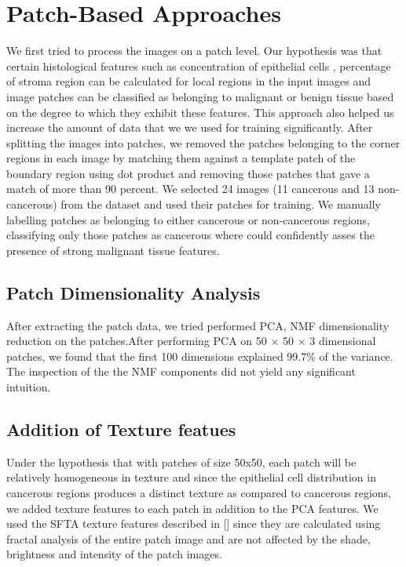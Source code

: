 \section{Patch-Based Approaches}
\label{sec:patch_based_approaches}
We first tried to process the images on a patch level. Our hypothesis was that certain histological features such as concentration of epithelial cells , percentage of stroma region can be calculated for local regions in the input images and image patches can be classified as belonging to malignant or benign tissue based on the degree to which they exhibit these features. This approach also helped us increase the amount of data that we we used for training significantly. After splitting the images into patches, we removed the patches belonging to the corner regions in each image by matching them against a template patch of the boundary region using dot product and removing those patches that gave a match of more than 90 percent. We selected 24 images (11 cancerous and 13 non-cancerous) from the dataset and used their patches for training. We manually labelling patches as belonging to either cancerous or non-cancerous regions, classifying only those patches as cancerous where could confidently asses the presence of strong malignant tissue features. 

\subsection{Patch Dimensionality Analysis}
After extracting the patch data, we tried performed PCA, NMF dimensionality reduction on the patches.After performing PCA on 50 $\times$ 50 $\times$ 3 dimensional patches, we found that the first 100 dimensions explained 99.7\% of the variance. The inspection of the the NMF components did not yield any significant intuition.


\subsection{Addition of Texture featues}
Under the hypothesis that with patches of size 50x50, each patch will be relatively homogeneous in texture and since the epithelial cell distribution in cancerous regions produces a distinct texture as compared to cancerous regions, we added texture features to each patch in addition to the PCA features. We used the SFTA texture features described in [] since they are calculated using fractal analysis of the entire patch image and are not affected by the shade, brightness and intensity of the patch images.


